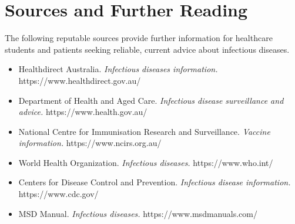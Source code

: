\section*{Sources and Further Reading}
The following reputable sources provide further information for healthcare students and patients seeking reliable, current advice about infectious diseases.
\begin{itemize}
    \item Healthdirect Australia. \textit{Infectious diseases information.} https://www.healthdirect.gov.au/
    \item Department of Health and Aged Care. \textit{Infectious disease surveillance and advice.} https://www.health.gov.au/
    \item National Centre for Immunisation Research and Surveillance. \textit{Vaccine information.} https://www.ncirs.org.au/
    \item World Health Organization. \textit{Infectious diseases.} https://www.who.int/
    \item Centers for Disease Control and Prevention. \textit{Infectious disease information.} https://www.cdc.gov/
    \item MSD Manual. \textit{Infectious diseases.} https://www.msdmanuals.com/
\end{itemize}
